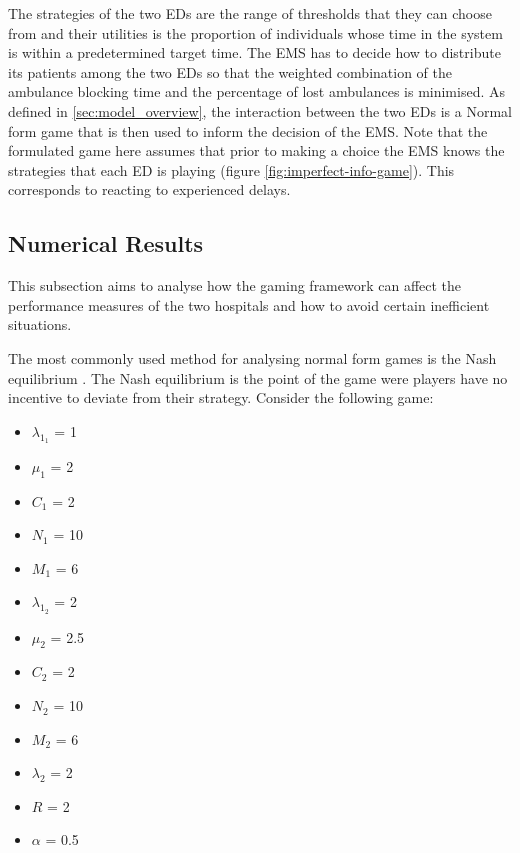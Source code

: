 The strategies of the two EDs are the range of thresholds that they can choose
from and their utilities is the proportion of individuals whose time in the 
system is within a predetermined target time.
The EMS has to decide how to distribute its patients among the two EDs so that 
the weighted combination of the ambulance blocking time and the percentage of 
lost ambulances is minimised. 
As defined in \ref{sec:model_overview}, the interaction between the two EDs 
is a Normal form game that is then used to inform the decision of the EMS.
Note that the formulated game here assumes that prior to making a choice the 
EMS knows the strategies that each ED is playing (figure 
\ref{fig:imperfect-info-game}). This corresponds to reacting to experienced delays.

\subsection{Numerical Results}

This subsection aims to analyse how the gaming framework can affect the 
performance measures of the two hospitals and how to avoid certain inefficient 
situations.

The most commonly used method for analysing normal form games is the Nash 
equilibrium \cite{kreps1989nash}. 
The Nash equilibrium is the point of the game were players have no incentive to 
deviate from their strategy.
Consider the following game:

\begin{multicols}{3}
    \begin{itemize}
        \item \( \lambda_{1_1} \) = 1
        \item \( \mu_1 \) = 2
        \item \( C_1 \) = 2
        \item \( N_1 \) = 10
        \item \( M_1 \) = 6
        \columnbreak

        \item \( \lambda_{1_2} \) = 2
        \item \( \mu_2 \) = 2.5
        \item \( C_2 \) = 2
        \item \( N_2 \) = 10
        \item \( M_2 \) = 6
        \columnbreak

        \item \( \lambda_2 \) = 2
        \item \( R \) = 2
        \item \( \alpha \) = 0.5
    \end{itemize}
\end{multicols}

